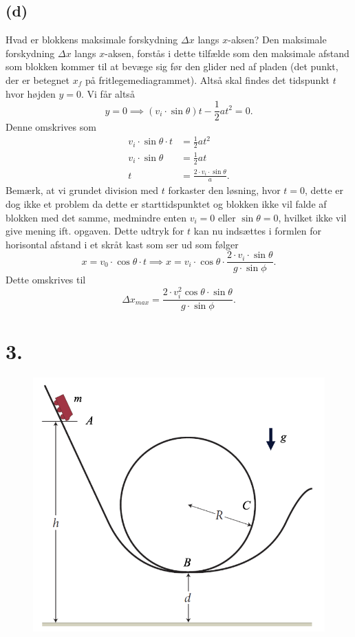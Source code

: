 \documentclass[12pt]{article}
\theoremstyle{definition}
\begin{document}
\subsection*{(d)}
Hvad er blokkens maksimale forskydning $\Delta x$ langs $x$-aksen?
\bigbreak
Den maksimale forskydning $\Delta x$ langs $x$-aksen, forstås i dette tilfælde som den maksimale afstand som blokken kommer til at bevæge sig før den glider ned af pladen (det punkt, der er betegnet $x_{f}$ på fritlegemediagrammet). Altså skal findes det tidspunkt $t$ hvor højden $y = 0$. Vi får altså
\[ 
y = 0 \implies (v_i \cdot \sin \theta)t - \frac{1}{2}at^2 = 0
.\]
Denne omskrives som
\begin{align*}
  v_i \cdot \sin\theta \cdot t &= \frac{1}{2}at^2 \\
  v_i \cdot \sin\theta &= \frac{1}{2}at \\
  t &= \frac{2\cdot v_i \cdot \sin\theta}{a}
.\end{align*}
Bemærk, at vi grundet division med $t$ forkaster den løsning, hvor $t = 0$, dette er dog ikke et problem da dette er starttidspunktet og blokken ikke vil falde af blokken med det samme, medmindre enten $v_i = 0$ eller $\sin\theta = 0$, hvilket ikke vil give mening ift. opgaven. Dette udtryk for $t$ kan nu indsættes i formlen for horisontal afstand i et skråt kast som ser ud som følger
\[ 
x = v_0 \cdot \cos \theta \cdot t \implies x = v_i \cdot \cos\theta \cdot \frac{2 \cdot v_i \cdot \sin\theta}{g\cdot \sin\phi}
.\]
Dette omskrives til
\[
  \Delta x_{max} = \frac{2 \cdot v_i^2 \cos \theta \cdot \sin\theta}{g\cdot \sin\phi}
.\]


\section*{3.}
\begin{figure} [ht]
  \centering
  \caption{}
  \includegraphics[width=0.5\linewidth]{../figures/E3_3.png}
  \label{fig:E3_3}
\end{figure}
\end{document}
